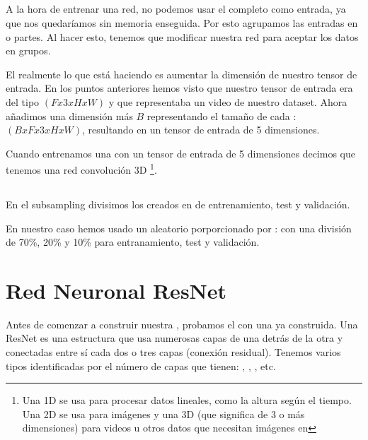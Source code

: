 \subsection{}

A la hora de entrenar una red, no podemos usar el  completo como entrada, ya que nos quedaríamos sin memoria enseguida. Por esto agrupamos las entradas en  o partes. Al hacer esto, tenemos que modificar nuestra red para aceptar los datos en grupos.

El  realmente lo que está haciendo es aumentar la dimensión de nuestro tensor de entrada. En los puntos anteriores hemos visto que nuestro tensor de entrada era del tipo $(Fx3xHxW)$ y que representaba un video de nuestro dataset. Ahora añadimos una dimensión más $B$ representando el tamaño de cada : $(BxFx3xHxW)$, resultando en un tensor de entrada de 5 dimensiones.

Cuando entrenamos una  con un tensor de entrada de 5 dimensiones decimos que tenemos una red convolución 3D \footnote{Una  1D se usa para procesar datos lineales, como la altura según el tiempo. Una  2D se usa para imágenes y una 3D (que significa de 3 o más dimensiones) para videos u otros datos que necesitan imágenes en  }.

\subsection{}

En el subsampling divisimos los  creados en  de entrenamiento, test y validación.

En nuestro caso hemos usado un  aleatorio porporcionado por :  con una división de 70\%, 20\% y 10\% para entranamiento, test y validación.


\section{Red Neuronal ResNet}

Antes de comenzar a construir nuestra , probamos el  con una  ya construida. Una ResNet  es una estructura que usa numerosas capas de  una detrás de la otra y conectadas entre sí cada dos o tres capas (conexión residual). Tenemos varios tipos identificadas por el número de capas que tienen: ,  , , etc.

